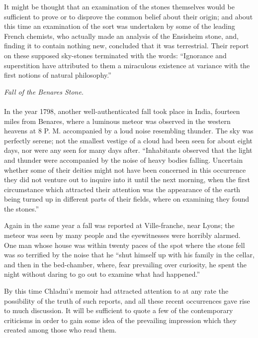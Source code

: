 \documentclass[a4paper, 11pt, oneside]{article}
\begin{document}
It might be thought that an examination of the stones themselves would be sufficient to prove or to disprove the common belief about their origin; and about this time an examination of the sort was undertaken by some of the leading French chemists, who actually made an analysis of the Ensisheim stone, and, finding it to contain nothing new, concluded that it was terrestrial. Their report on these supposed sky-stones terminated with the words: ``Ignorance and superstition have attributed to them a miraculous existence at variance with the first notions of natural philosophy.'' 
\begin{center}
\emph{Fall of the Benares Stone.}
\end{center}
\paragraph{}
In the year 1798, another well-authenticated fall took place in India, fourteen miles from Benares, where a luminous meteor was observed in the western heavens at 8 P. M. accompanied by a loud noise resembling thunder. The sky was perfectly serene; not the smallest vestige of a cloud had been seen for about eight days, nor were any seen for many days after. ``Inhabitants observed that the light and thunder were accompanied by the noise of heavy bodies falling. Uncertain whether some of their deities might not have been concerned in this occurrence they did not venture out to inquire into it until the next morning, when the first circumstance which attracted their attention was the appearance of the earth being turned up in different parts of their fields, where on examining they found the stones.'' 

Again in the same year a fall was reported at Ville-franche, near Lyons; the meteor was seen by many people and the eyewitnesses were horribly alarmed. One man whose house was within twenty paces of the spot where the stone fell was so terrified by the noise that he ``shut himself up with his family in the cellar, and then in the bed-chamber, where, fear prevailing over curiosity, he spent the night without daring to go out to examine what had happened.'' 

By this time Chladni's memoir had attracted attention to at any rate the possibility of the truth of such reports, and all these recent occurrences gave rise to much discussion. It will be sufficient to quote a few of the contemporary criticisms in order to gain some idea of the prevailing impression which they created among those who read them. 
\end{document}
